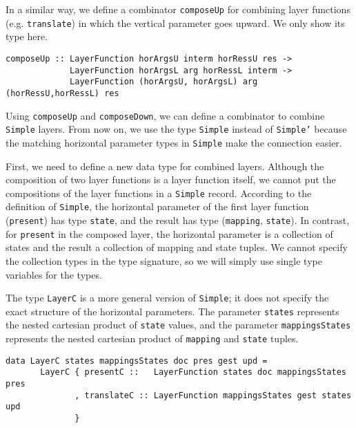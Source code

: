 \par In a similar way, we define a combinator \texttt{composeUp} for
      combining layer functions (e.g. \texttt{translate}) in which the vertical
      parameter goes upward. We only show its type here.\begin{small}\begin{verbatim}composeUp :: LayerFunction horArgsU interm horRessU res ->
             LayerFunction horArgsL arg horRessL interm ->
             LayerFunction (horArgsU, horArgsL) arg (horRessU,horRessL) res
\end{verbatim}\end{small}

\par {}Using \texttt{composeUp} and
      \texttt{composeDown}, we can define a combinator to combine \texttt{Simple}
      layers. From now on, we use the type \texttt{Simple} instead of
      \texttt{Simple'} because the matching horizontal parameter types in
      \texttt{Simple} make the connection easier. 
\par First, we need to define a new data type for combined layers. Although
      the composition of two layer functions is a layer function itself, we cannot
      put the compositions of the layer functions in a \texttt{Simple} record.
      According to the definition of \texttt{Simple}, the horizontal parameter of the
      first layer function (\texttt{present}) has type \texttt{state}, and the result
      has type (\texttt{mapping}, \texttt{state}). In contrast, for \texttt{present}
      in the composed layer, the horizontal parameter is a collection of states and
      the result a collection of mapping and state tuples. We cannot specify the
      collection types in the type signature, so we will simply use single type
      variables for the types.
\par The type \texttt{LayerC} is a more general version of \texttt{Simple};
      it does not specify the exact structure of the horizontal parameters. The
      parameter \texttt{states} represents the nested cartesian product of
      \texttt{state} values, and the parameter \texttt{mappingsStates} represents the
      nested cartesian product of \texttt{mapping} and \texttt{state} tuples.\begin{small}\begin{verbatim}data LayerC states mappingsStates doc pres gest upd =
       LayerC { presentC ::   LayerFunction states doc mappingsStates pres
              , translateC :: LayerFunction mappingsStates gest states upd
              }
\end{verbatim}\end{small}

